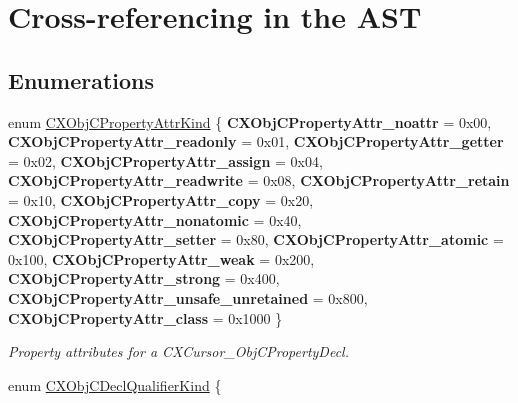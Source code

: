 \hypertarget{group__CINDEX__CURSOR__XREF}{}\section{Cross-\/referencing in the A\+ST}
\label{group__CINDEX__CURSOR__XREF}
\subsection*{Enumerations}
\begin{DoxyCompactItemize}
\item 
\mbox{\label{group__CINDEX__CURSOR__XREF_ga7bb83a8c353185d13641f001a4c4b6c7}} 
enum \mbox{\hyperlink{group__CINDEX__CURSOR__XREF_ga7bb83a8c353185d13641f001a4c4b6c7}{C\+X\+Obj\+C\+Property\+Attr\+Kind}} \{ \newline
{\bfseries C\+X\+Obj\+C\+Property\+Attr\+\_\+noattr} = 0x00, 
{\bfseries C\+X\+Obj\+C\+Property\+Attr\+\_\+readonly} = 0x01, 
{\bfseries C\+X\+Obj\+C\+Property\+Attr\+\_\+getter} = 0x02, 
{\bfseries C\+X\+Obj\+C\+Property\+Attr\+\_\+assign} = 0x04, 
\newline
{\bfseries C\+X\+Obj\+C\+Property\+Attr\+\_\+readwrite} = 0x08, 
{\bfseries C\+X\+Obj\+C\+Property\+Attr\+\_\+retain} = 0x10, 
{\bfseries C\+X\+Obj\+C\+Property\+Attr\+\_\+copy} = 0x20, 
{\bfseries C\+X\+Obj\+C\+Property\+Attr\+\_\+nonatomic} = 0x40, 
\newline
{\bfseries C\+X\+Obj\+C\+Property\+Attr\+\_\+setter} = 0x80, 
{\bfseries C\+X\+Obj\+C\+Property\+Attr\+\_\+atomic} = 0x100, 
{\bfseries C\+X\+Obj\+C\+Property\+Attr\+\_\+weak} = 0x200, 
{\bfseries C\+X\+Obj\+C\+Property\+Attr\+\_\+strong} = 0x400, 
\newline
{\bfseries C\+X\+Obj\+C\+Property\+Attr\+\_\+unsafe\+\_\+unretained} = 0x800, 
{\bfseries C\+X\+Obj\+C\+Property\+Attr\+\_\+class} = 0x1000
 \}
\begin{DoxyCompactList}\small\item\em Property attributes for a {\ttfamily C\+X\+Cursor\+\_\+\+Obj\+C\+Property\+Decl}. \end{DoxyCompactList}\item 
\mbox{\label{group__CINDEX__CURSOR__XREF_ga1267244d5761be84f8680e455199bac2}} 
enum \mbox{\hyperlink{group__CINDEX__CURSOR__XREF_ga1267244d5761be84f8680e455199bac2}{C\+X\+Obj\+C\+Decl\+Qualifier\+Kind}} \{ \newline

\end{DoxyCompactItemize}
